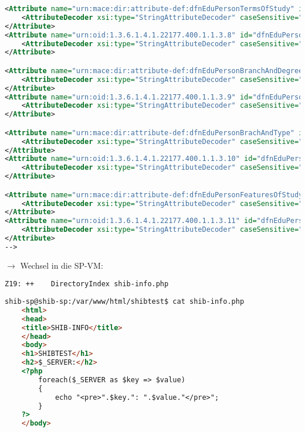 \begin{lstlisting}[language=xml]
<Attribute name="urn:mace:dir:attribute-def:dfnEduPersonTermsOfStudy" id="dfnEduPersonTermsOfStudy">
	<AttributeDecoder xsi:type="StringAttributeDecoder" caseSensitive="false"/>
</Attribute>
<Attribute name="urn:oid:1.3.6.1.4.1.22177.400.1.1.3.8" id="dfnEduPersonTermsOfStudy">
	<AttributeDecoder xsi:type="StringAttributeDecoder" caseSensitive="false"/>
</Attribute>

<Attribute name="urn:mace:dir:attribute-def:dfnEduPersonBranchAndDegree" id="dfnEduPersonBranchAndDegree">
	<AttributeDecoder xsi:type="StringAttributeDecoder" caseSensitive="false"/>
</Attribute>
<Attribute name="urn:oid:1.3.6.1.4.1.22177.400.1.1.3.9" id="dfnEduPersonBranchAndDegree">
	<AttributeDecoder xsi:type="StringAttributeDecoder" caseSensitive="false"/>
</Attribute>

<Attribute name="urn:mace:dir:attribute-def:dfnEduPersonBrachAndType" id="dfnEduPersonBrachAndType">
	<AttributeDecoder xsi:type="StringAttributeDecoder" caseSensitive="false"/>
</Attribute>
<Attribute name="urn:oid:1.3.6.1.4.1.22177.400.1.1.3.10" id="dfnEduPersonBrachAndType">
	<AttributeDecoder xsi:type="StringAttributeDecoder" caseSensitive="false"/>
</Attribute>

<Attribute name="urn:mace:dir:attribute-def:dfnEduPersonFeaturesOfStudy" id="dfnEduPersonFeaturesOfStudy">
	<AttributeDecoder xsi:type="StringAttributeDecoder" caseSensitive="false"/>
</Attribute>
<Attribute name="urn:oid:1.3.6.1.4.1.22177.400.1.1.3.11" id="dfnEduPersonFeaturesOfStudy">
	<AttributeDecoder xsi:type="StringAttributeDecoder" caseSensitive="false"/>
</Attribute>
-->
\end{lstlisting}


$\rightarrow$ Wechsel in die SP-VM:
\begin{lstlisting}
Z19: ++    DirectoryIndex shib-info.php
\end{lstlisting}
\begin{lstlisting}[language=html]
shib-sp@shib-sp:/var/www/html/shibtest$ cat shib-info.php
	<html>
	<head>
	<title>SHIB-INFO</title>
	</head>
	<body>
	<h1>SHIBTEST</h1>
	<h2>$_SERVER:</h2>
	<?php
		foreach($_SERVER as $key => $value)
		{
			echo "<pre>".$key.": ".$value."</pre>";
		}
	?>
	</body>
\end{lstlisting}

